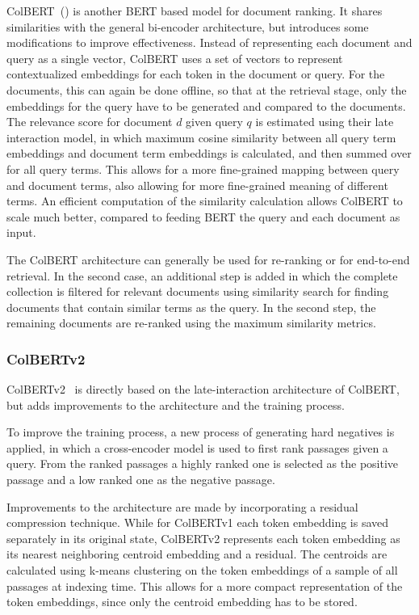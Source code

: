 ColBERT~(\cite{khattab:2020:Colbert}) is another BERT based model for document ranking.
It shares similarities with the general bi-encoder architecture, but introduces some modifications to improve effectiveness.
Instead of representing each document and query as a single vector, ColBERT uses a set of vectors to represent contextualized embeddings for each token in the document or query.
For the documents, this can again be done offline, so that at the retrieval stage, only the embeddings for the query have to be generated and compared to the documents.
The relevance score for document $d$ given query $q$ is estimated using their late interaction model, in which maximum cosine similarity between all query term embeddings and document term embeddings is calculated, and then summed over for all query terms.
This allows for a more fine-grained mapping between query and document terms, also allowing for more fine-grained meaning of different terms.
An efficient computation of the similarity calculation allows ColBERT to scale much better, compared to feeding BERT the query and each document as input.

The ColBERT architecture can generally be used for re-ranking or for end-to-end retrieval.
In the second case, an additional step is added in which the complete collection is filtered for relevant documents using similarity search for finding documents that contain similar terms as the query.
In the second step, the remaining documents are re-ranked using the maximum similarity metrics.

\subsubsection{ColBERTv2}\label{sec:colbertv2}
ColBERTv2~\citep{santhanam:2021:Colbertv2} is directly based on the late-interaction architecture of ColBERT, but adds improvements to the architecture and the training process.

To improve the training process, a new process of generating hard negatives is applied, in which a cross-encoder model is used to first rank passages given a query.
From the ranked passages a highly ranked one is selected as the positive passage and a low ranked one as the negative passage.

Improvements to the architecture are made by incorporating a residual compression technique.
While for ColBERTv1 each token embedding is saved separately in its original state, ColBERTv2 represents each token embedding as its nearest neighboring centroid embedding and a residual.
The centroids are calculated using k-means clustering on the token embeddings of a sample of all passages at indexing time. 
This allows for a more compact representation of the token embeddings, since only the centroid embedding has to be stored.

